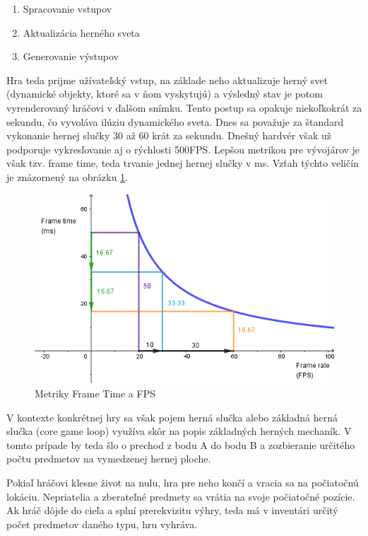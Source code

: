\documentclass[slovak, master]{diploma}
\begin{document}
\begin{enumerate}
  \item Spracovanie vstupov
  \item Aktualizácia herného sveta
  \item Generovanie výstupov
\end{enumerate}

Hra teda prijme užívateľský vstup, na základe neho aktualizuje herný svet (dynamické objekty, ktoré sa v ňom vyskytujú) a výsledný stav je potom vyrenderovaný hráčovi v ďalšom snímku. Tento postup sa opakuje niekoľkokrát za sekundu, čo vyvoláva ilúziu dynamického sveta. Dnes sa považuje za štandard vykonanie hernej slučky 30 až 60 krát za sekundu. Dnešný hardvér však už podporuje vykresľovanie aj o rýchlosti 500FPS. Lepšou metrikou pre vývojárov je však tzv. frame time, teda trvanie jednej hernej slučky v ms. Vzťah týchto veličín je znázornený na obrázku \ref{pic:FrameTimeFPS}.

\begin{figure}[!htbp]
	\centering
	\includegraphics[width=.8\textwidth]{Figures/frameTimeVsFPS.png}
	\caption{Metriky Frame Time a FPS \cite{FrameTimeFPS}}
	\label{pic:FrameTimeFPS}
\end{figure}

V kontexte konkrétnej hry sa však pojem herná slučka alebo základná herná slučka (core game loop) využíva skôr na popis základných herných mechaník. V tomto prípade by teda šlo o prechod z bodu A do bodu B a zozbieranie určitého počtu predmetov na vymedzenej hernej ploche.

Pokiaľ hráčovi klesne život na nulu, hra pre neho končí a vracia sa na počiatočnú lokáciu. Nepriatelia a zberateľné predmety sa vrátia na svoje počiatočné pozície. Ak hráč dôjde do cieľa a splní prerekvizitu výhry, teda má v inventári určitý počet predmetov daného typu, hru vyhráva. 
\end{document}
